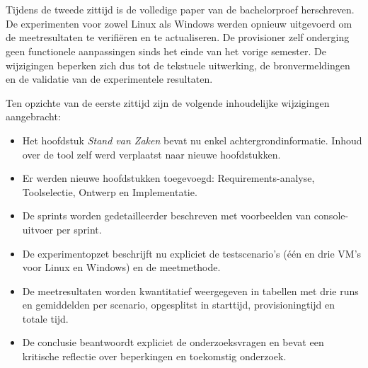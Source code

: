 \chapter*{}%
\label{ch:tweede-zittijd}

Tijdens de tweede zittijd is de volledige paper van de bachelorproef herschreven. 
De experimenten voor zowel Linux als Windows werden opnieuw uitgevoerd om de meetresultaten te verifiëren en te actualiseren. De provisioner zelf onderging geen functionele aanpassingen sinds het einde van het vorige semester. De wijzigingen beperken zich dus tot de tekstuele uitwerking, de bronvermeldingen en de validatie van de experimentele resultaten.

Ten opzichte van de eerste zittijd zijn de volgende inhoudelijke wijzigingen aangebracht:

\begin{itemize}
    \item Het hoofdstuk \textit{Stand van Zaken} bevat nu enkel achtergrondinformatie. Inhoud over de tool zelf werd verplaatst naar nieuwe hoofdstukken.
    \item Er werden nieuwe hoofdstukken toegevoegd: Requirements-analyse, Toolselectie, Ontwerp en Implementatie.
    \item De sprints worden gedetailleerder beschreven met voorbeelden van console-uitvoer per sprint.
    \item De experimentopzet beschrijft nu expliciet de testscenario's (één en drie VM's voor Linux en Windows) en de meetmethode.
    \item De meetresultaten worden kwantitatief weergegeven in tabellen met drie runs en gemiddelden per scenario, opgesplitst in starttijd, provisioningtijd en totale tijd.
    \item De conclusie beantwoordt expliciet de onderzoeksvragen en bevat een kritische reflectie over beperkingen en toekomstig onderzoek.
\end{itemize}